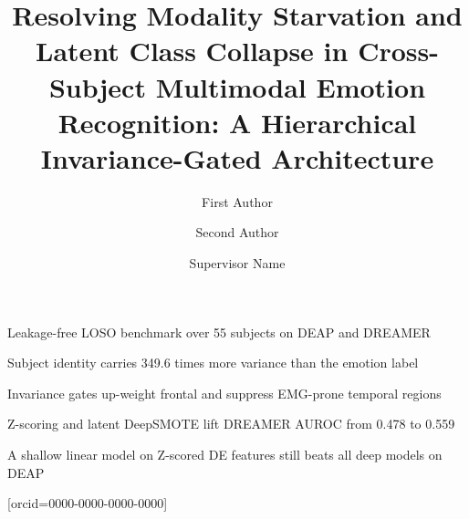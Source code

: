 \documentclass[a4paper,fleqn]{cas-sc}
\begin{document}
\let\WriteBookmarks\relax
\def\floatpagefraction{0.8}
\def\textpagefraction{0.001}


\begin{highlights}
\item Leakage-free LOSO benchmark over 55 subjects on DEAP and DREAMER
\item Subject identity carries 349.6 times more variance than the emotion label
\item Invariance gates up-weight frontal and suppress EMG-prone temporal regions
\item Z-scoring and latent DeepSMOTE lift DREAMER AUROC from 0.478 to 0.559
\item A shallow linear model on Z-scored DE features still beats all deep models on DEAP
\end{highlights}

\title [mode = title]{Resolving Modality Starvation and Latent Class Collapse in Cross-Subject Multimodal Emotion Recognition: A Hierarchical Invariance-Gated Architecture}

\author[1]{First Author}[orcid=0000-0000-0000-0000]
\cormark[1]

\author[1]{Second Author}

\author[1]{Supervisor Name}


\end{document}
